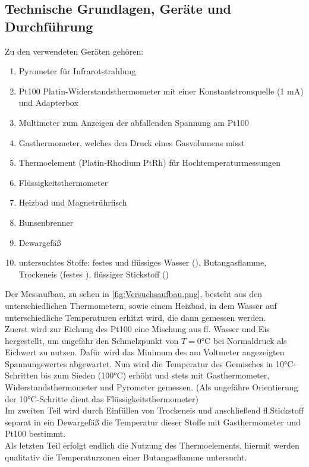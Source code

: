 \subsection{Technische Grundlagen, Geräte und Durchführung}
Zu den verwendeten Geräten gehören:
\begin{enumerate}
    \setlength{\itemsep}{-6pt}
    \item Pyrometer für Infrarotstrahlung
    \item Pt100 Platin-Widerstandsthermometer mit einer Konstantstromquelle (1 mA) und Adapterbox
    \item Multimeter zum Anzeigen der abfallenden Spannung am Pt100
    \item Gasthermometer, welches den Druck eines Gasvolumens misst 
    \item Thermoelement (Platin-Rhodium PtRh) für Hochtemperaturmessungen
    \item Flüssigkeitsthermometer
    \item Heizbad und Magnetrührfisch
    \item Bunsenbrenner
    \item Dewargefäß
    \item untersuchtes Stoffe: festes und flüssiges Wasser (), Butangasflamme, Trockeneis (festes ), flüssiger Stickstoff ()
\end{enumerate}
\newpage
{}
Der Messaufbau, zu sehen in \cref{fig:Versuchsaufbau.png}, besteht aus den unterschiedlichen Thermometern, sowie einem Heizbad, in dem Wasser auf unterschiedliche Temperaturen erhitzt wird, die dann gemessen werden. \\
Zuerst wird zur Eichung des Pt100 eine Mischung aus fl. Wasser und Eis hergestellt, um ungefähr den Schmelzpunkt von  \(T=0\unit{\degreeCelsius}\) bei Normaldruck als Eichwert zu nutzen. Dafür wird das Minimum des am Voltmeter angezeigten Spannungswertes abgewartet. Nun wird die Temperatur des Gemisches in 10\unit{\degreeCelsius}-Schritten bis zum Sieden (100\unit{\degreeCelsius}) erhöht und stets mit Gasthermometer, Widerstandsthermometer und Pyrometer gemessen. (Als ungefähre Orientierung der 10\unit{\degreeCelsius}-Schritte dient das Flüssigkeitsthermometer)\\
Im zweiten Teil wird durch Einfüllen von Trockeneis und anschließend fl.Stickstoff separat in ein Dewargefäß die Temperatur dieser Stoffe mit Gasthermometer und Pt100 bestimmt. \\
Als letzten Teil erfolgt endlich die Nutzung des Thermoelements, hiermit werden qualitativ die Temperaturzonen einer Butangasflamme untersucht. 

